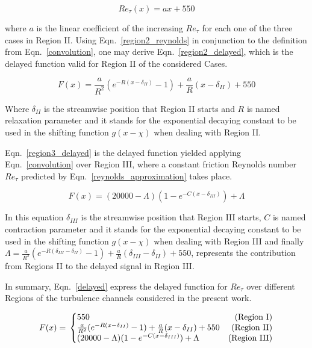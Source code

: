 \documentclass[twocolumn,10pt]{asme2e}
\begin{document}
\begin{equation}
Re_{\tau}(x)=ax+550
\label{region2_reynolds}
\end{equation}

where \(a\) is the linear coefficient of the increasing \(Re_{\tau}\) for each one of the three cases in Region II. Using Eqn.~\ref{region2_reynolds} in conjunction to the definition from Eqn.~\ref{convolution}, one may derive Eqn.~\ref{region2_delayed}, which is the delayed function valid for Region II of the considered Cases.

\begin{equation}
F(x)= \frac{a}{R^2}(e^{-R(x-{\delta}_{II})}-1)+\frac{a}{R}(x-{\delta}_{II})+550
\label{region2_delayed}
\end{equation}

Where \({\delta}_{II}\) is the streamwise position that Region II starts and \(R\) is named relaxation parameter and it stands for the exponential decaying constant to be used in the shifting function \(g(x-\chi)\) when dealing with Region II.

Eqn.~\ref{region3_delayed} is the delayed function yielded applying Eqn.~\ref{convolution} over Region III, where a constant friction Reynolds number \(Re_{\tau}\) predicted by Eqn.~\ref{reynolds_approximation} takes place.

\begin{equation}
F(x)= (20000-{\Lambda})(1-e^{-C(x-{\delta}_{III})})+{\Lambda}
\label{region3_delayed}
\end{equation}

In this equation \({\delta}_{III}\) is the streamwise position that Region III starts, \(C\) is named contraction parameter and it stands for the exponential decaying constant to be used in the shifting function \(g(x-\chi)\) when dealing with Region III and finally \({\Lambda}=\frac{a}{R^2}(e^{-R({\delta}_{III}-{\delta}_{II})}-1)+\frac{a}{R}({\delta}_{III}-{\delta}_{II})+550\), represents the contribution from Regions II to the delayed signal in Region III.

In summary, Eqn.~\ref{delayed} express the delayed function for \(Re_{\tau}\) over different Regions of the turbulence channels considered in the present work.

\begin{equation} \label{delayed}
F(x) = \\
    \left\{\begin{array}{@{}lr@{}}
        550  & \text{(Region I)}\\
        \frac{a}{R^2}(e^{-R(x-{\delta}_{II})}-1)+\frac{a}{R}(x-{\delta}_{II})+550 & \text{(Region II)}\\
        (20000-{\Lambda})(1-e^{-C(x-{\delta}_{III})})+{\Lambda} &  \text{(Region III)}
\end{array}\right.
\end{equation}
\end{document}
